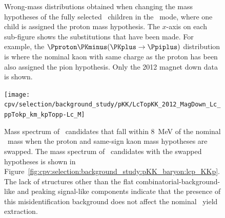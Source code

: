 \begin{figure}
  \caption{%
    Wrong-mass distributions obtained when changing the mass hypotheses of the
    fully selected \PLambdac\ children in the \pKK\ mode, where one child is
    assigned the proton mass hypothesis.
    The $x$-axis on each sub-figure shows the substitutions that have been
    made.
    For example, the ${\Pproton\PKminus(\PKplus \to \Ppiplus)}$ distribution is where the
    nominal kaon with same charge as the proton has been also assigned the pion
    hypothesis.
    Only the 2012 magnet down data is shown.
  }
  \label{fig:cpv:selection:background_study:pKK_baryon}
\end{figure}

\begin{figure}
  \centering
  \texttt{[image: cpv/selection/background\_study/pKK/LcTopKK\_2012\_MagDown\_Lc\_ppTokp\_km\_kpTopp-Lc\_M]}
  \caption{%
    Mass spectrum of \pKK\ candidates that fall within \SI{8}{\MeV} of the
    nominal \PLambdac\ mass when the proton and same-sign kaon mass hypotheses
    are swapped.
    The mass spectrum of \PLambdac\ candidates with the swapped hypotheses is
    shown in
    Figure~\ref{fig:cpv:selection:background_study:pKK_baryon:lcp_KKp}.
    The lack of structures other than the flat combinatorial-background-like
    and peaking signal-like components indicate that the presence of this
    misidentification background does not affect the nominal \pKK\ yield
    extraction.
  }
  \label{fig:cpv:selection:background_study:pKK_lcp_KKp_Lc_M}
\end{figure}


